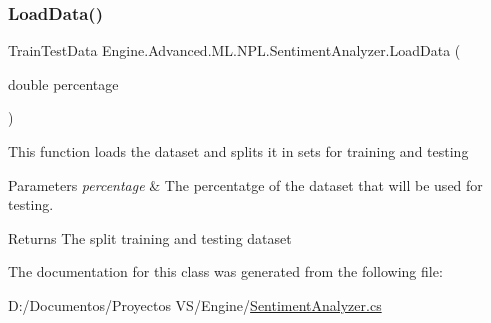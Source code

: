\subsubsection{\texorpdfstring{LoadData()}{LoadData()}}
{\footnotesize\ttfamily Train\+Test\+Data Engine.\+Advanced.\+M\+L.\+N\+P\+L.\+Sentiment\+Analyzer.\+Load\+Data (\begin{DoxyParamCaption}\item[{double}]{percentage }\end{DoxyParamCaption})}



This function loads the dataset and splits it in sets for training and testing 


\begin{DoxyParams}{Parameters}
{\em percentage} & The percentatge of the dataset that will be used for testing.\\
\hline
\end{DoxyParams}
\begin{DoxyReturn}{Returns}
The split training and testing dataset
\end{DoxyReturn}


The documentation for this class was generated from the following file\+:\begin{DoxyCompactItemize}
\item 
D\+:/\+Documentos/\+Proyectos V\+S/\+Engine/\mbox{\hyperlink{_sentiment_analyzer_8cs}{Sentiment\+Analyzer.\+cs}}\end{DoxyCompactItemize}
